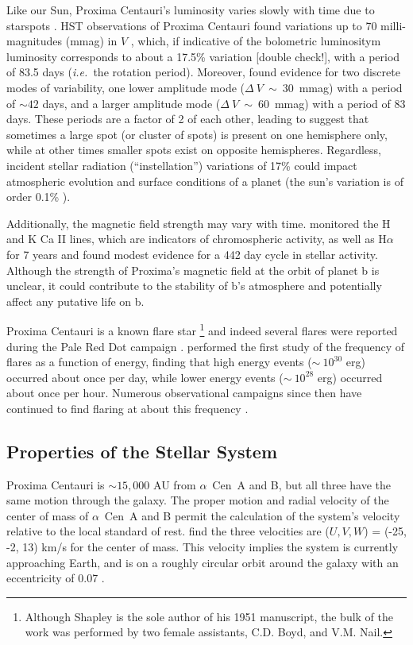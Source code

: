 \documentclass[preprint,12pt]{aastex}
\newcommand{\xxx}[1]{{\color{red} #1}} %
\def\ie{{\it i.e.\ }}
\def\acen{{$\alpha$~Cen}}
\begin{document}
Like our Sun, Proxima Centauri's luminosity varies slowly with time
due to starspots \citep{Benedict93}. HST observations of Proxima
Centauri found variations up to 70 milli-magnitudes (mmag) in $V$
\citep{Benedict98}, which, if indicative of the bolometric luminositym
\xxx{luminosity}
corresponds to about a 17.5\% variation \xxx{[double check!]}, with a
period of 83.5 days (\ie the rotation period). Moreover,
\citep{Benedict98} found evidence for two discrete modes of
variability, one lower amplitude mode ($\Delta~V~\sim~30$~mmag) with a
period of $\sim 42$ days, and a larger amplitude mode
($\Delta~V~\sim~60$~mmag) with a period of 83 days. These periods are
a factor of 2 of each other, leading \cite{Benedict98} to suggest that
sometimes a large spot (or cluster of spots) is present on one
hemisphere only, while at other times smaller spots exist on opposite
hemispheres. Regardless, incident stellar radiation (``instellation'')
variations of 17\% could impact atmospheric evolution and surface
conditions of a planet (the sun's variation is of order 0.1\%
\citep{Willson81}).

Additionally, the magnetic field strength may vary with
time. \cite{Cincunegui07} monitored the H and K Ca II lines, which are
indicators of chromospheric activity, as well as H$\alpha$ for 7 years
and found modest evidence for a 442 day cycle in stellar
activity. Although the strength of Proxima's magnetic field at the
orbit of planet b is unclear, it could contribute to the stability of
b's atmosphere and potentially affect any putative life on b. 

Proxima Centauri is a known flare star
\citep{Shapley51}\footnote{Although Shapley is the sole author of his
  1951 manuscript, the bulk of the work was performed by two female
  assistants, C.D. Boyd, and V.M. Nail.}  and indeed several flares
were reported during the Pale Red Dot campaign
\citep{AngladaEscude16}. \cite{Walker81} performed the first study of
the frequency of flares as a function of energy, finding that high
energy events ($\sim~10^{30}$ erg) occurred about once per day, while
lower energy events ($\sim~10^{28}$ erg) occurred about once per
hour. Numerous observational campaigns since then have continued to
find flaring at about this frequency
\citep{Benedict98,AngladaEscude16,Davenport16}.

\subsection{Properties of the Stellar System}
\label{sec:obs:stellarsys}
Proxima Centauri is $\sim 15,000$ AU from \acen~A and B, but all three have the
same motion through the galaxy. The proper motion and radial
velocity of the center of mass of \acen~A and B permit the calculation
of the system's velocity relative to the local standard of
rest. \cite{Poveda96} find the three velocities are ($U, V, W$) =
(-25, -2, 13) km/s for the center of mass. This velocity implies the
system is currently approaching Earth, and is on a roughly circular
orbit around the galaxy with an eccentricity of 0.07
\citep{AllenHerrera98}.
\end{document}
